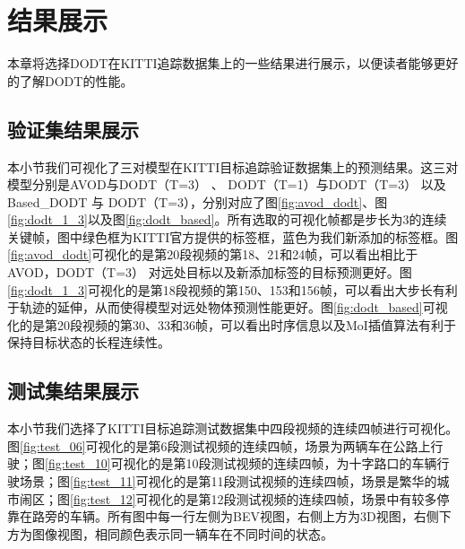 
\chapter{结果展示}
\label{ch:results}

本章将选择DODT在KITTI追踪数据集上的一些结果进行展示，以便读者能够更好的了解DODT的性能。

\section{验证集结果展示}
\label{val_results}
本小节我们可视化了三对模型在KITTI目标追踪验证数据集上的预测结果。这三对模型分别是AVOD与DODT（T=3） 、 DODT（T=1）与DODT（T=3） 以及Based\_DODT 与 DODT（T=3），分别对应了图\ref{fig:avod_dodt}、图\ref{fig:dodt_1_3}以及图\ref{fig:dodt_based}。所有选取的可视化帧都是步长为3的连续关键帧，图中绿色框为KITTI官方提供的标签框，蓝色为我们新添加的标签框。图\ref{fig:avod_dodt}可视化的是第20段视频的第18、21和24帧，可以看出相比于AVOD，DODT（T=3） 对远处目标以及新添加标签的目标预测更好。图\ref{fig:dodt_1_3}可视化的是第18段视频的第150、153和156帧，可以看出大步长有利于轨迹的延伸，从而使得模型对远处物体预测性能更好。图\ref{fig:dodt_based}可视化的是第20段视频的第30、33和36帧，可以看出时序信息以及MoI插值算法有利于保持目标状态的长程连续性。




\section{测试集结果展示}
\label{test_results}

本小节我们选择了KITTI目标追踪测试数据集中四段视频的连续四帧进行可视化。图\ref{fig:test_06}可视化的是第6段测试视频的连续四帧，场景为两辆车在公路上行驶；图\ref{fig:test_10}可视化的是第10段测试视频的连续四帧，为十字路口的车辆行驶场景；图\ref{fig:test_11}可视化的是第11段测试视频的连续四帧，场景是繁华的城市闹区；图\ref{fig:test_12}可视化的是第12段测试视频的连续四帧，场景中有较多停靠在路旁的车辆。所有图中每一行左侧为BEV视图，右侧上方为3D视图，右侧下方为图像视图，相同颜色表示同一辆车在不同时间的状态。



\ifprint
	\newpage
	\thispagestyle{empty}
	\mbox{}
	
	\clearpage
	\setcounter{page}{10}
\fi
